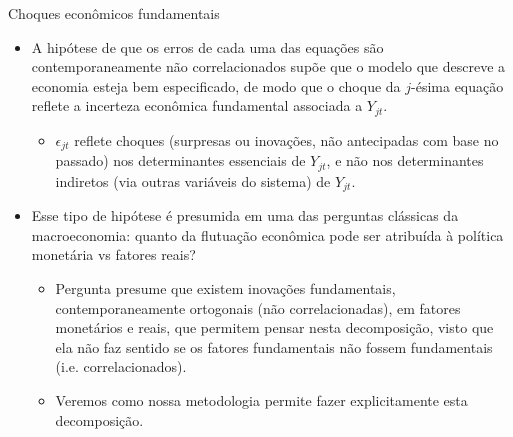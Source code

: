 \documentclass[11pt]{beamer}
\begin{document}
\begin{frame}{Choques econômicos fundamentais }
	\begin{itemize}
		\item A hipótese de que os erros de cada uma das equações são contemporaneamente não correlacionados supõe que o modelo que descreve a economia esteja {\color{blue}bem especificado}, de modo que o choque da $j$-ésima equação reflete a incerteza econômica fundamental associada a $Y_{jt}$.
		\begin{itemize}
			\item $\epsilon_{jt}$ reflete choques (surpresas ou inovações, não antecipadas com base no passado) nos determinantes essenciais de $Y_{jt}$, e não nos determinantes indiretos (via outras variáveis do sistema) de $Y_{jt}$. 
	
		\end{itemize}
				\item Esse tipo de hipótese é presumida em uma das perguntas clássicas da macroeconomia: quanto da flutuação econômica pode ser atribuída à política monetária vs fatores reais?
				\begin{itemize}
					\item Pergunta presume que existem inovações fundamentais, contemporaneamente ortogonais (não correlacionadas), em fatores monetários e reais, que permitem pensar nesta decomposição, visto que ela não faz sentido se os fatores fundamentais não fossem fundamentais (i.e. correlacionados).
					\item Veremos como nossa metodologia permite fazer explicitamente esta decomposição.
				\end{itemize}
	
	\end{itemize}
\end{frame}
\end{document}
